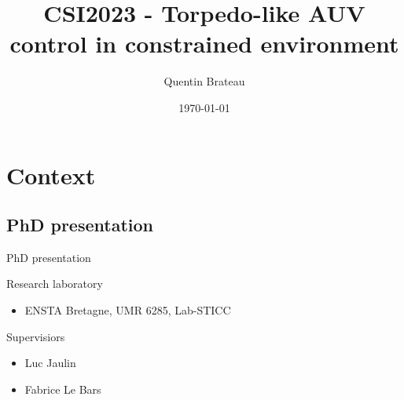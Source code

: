 \documentclass[10pt, xcolor={usenames, dvipsnames}]{beamer}
\title{CSI2023 - Torpedo-like AUV control in constrained environment}
\date{\today}
\author{Quentin Brateau}
\institute{ENSTA Bretagne}
\begin{document}
    \maketitle

    \section{Context}

        \subsection{PhD presentation}

            \begin{frame}{PhD presentation}
                \centering
                \begin{minipage}[c]{0.58\textwidth}
                    \begin{block}{Research laboratory}
                        \vspace{0.2cm}
                        \begin{itemize}
                            \item ENSTA Bretagne, UMR 6285, Lab-STICC
                        \end{itemize}
                    \end{block}

                    \begin{block}{Supervisiors}
                        \begin{itemize}
                            \item Luc Jaulin
                            \item Fabrice Le Bars
                        \end{itemize}
                    \end{block}


\end{minipage}
\end{frame}
\end{document}
